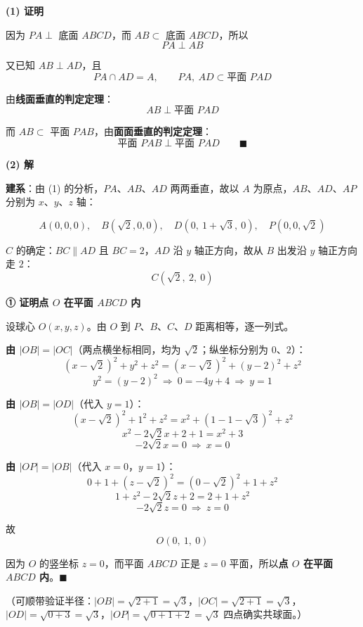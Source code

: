 \textbf{(1) 证明}

因为 $PA\perp$ 底面 $ABCD$，而 $AB\subset$ 底面 $ABCD$，所以
\[PA\perp AB\]

又已知 $AB\perp AD$，且
\[PA\cap AD=A,\qquad PA,\ AD\subset\text{平面 }PAD\]

由\textbf{线面垂直的判定定理}：
\[AB\perp\text{平面 }PAD\]

而 $AB\subset$ 平面 $PAB$，由\textbf{面面垂直的判定定理}：
\[\text{平面 }PAB\perp\text{平面 }PAD\qquad\blacksquare\]

\par\medskip

\textbf{(2) 解}

\textbf{建系}：由 (1) 的分析，$PA$、$AB$、$AD$ 两两垂直，故以 $A$ 为原点，$AB$、$AD$、$AP$ 分别为 $x$、$y$、$z$ 轴：

\[A(0,0,0),\quad B\left(\sqrt2,0,0\right),\quad D\left(0,\ 1+\sqrt3,\ 0\right),\quad P\left(0,0,\sqrt2\right)\]

$C$ 的确定：$BC\parallel AD$ 且 $BC=2$，$AD$ 沿 $y$ 轴正方向，故从 $B$ 出发沿 $y$ 轴正方向走 $2$：
\[C\left(\sqrt2,\ 2,\ 0\right)\]

\par\medskip

\textbf{① 证明点 $O$ 在平面 $ABCD$ 内}

设球心 $O(x,y,z)$。由 $O$ 到 $P$、$B$、$C$、$D$ 距离相等，逐一列式。

\textbf{由 $|OB|=|OC|$}（两点横坐标相同，均为 $\sqrt2$；纵坐标分别为 $0$、$2$）：
\[(x-\sqrt2)^2+y^2+z^2=(x-\sqrt2)^2+(y-2)^2+z^2\]
\[y^2=(y-2)^2\ \Longrightarrow\ 0=-4y+4\ \Longrightarrow\ y=1\]

\textbf{由 $|OB|=|OD|$}（代入 $y=1$）：
\[(x-\sqrt2)^2+1^2+z^2=x^2+\left(1-1-\sqrt3\right)^2+z^2\]
\[x^2-2\sqrt2x+2+1=x^2+3\]
\[-2\sqrt2x=0\ \Longrightarrow\ x=0\]

\textbf{由 $|OP|=|OB|$}（代入 $x=0$，$y=1$）：
\[0+1+\left(z-\sqrt2\right)^2=\left(0-\sqrt2\right)^2+1+z^2\]
\[1+z^2-2\sqrt2z+2=2+1+z^2\]
\[-2\sqrt2z=0\ \Longrightarrow\ z=0\]

故
\[O(0,\ 1,\ 0)\]

因为 $O$ 的竖坐标 $z=0$，而平面 $ABCD$ 正是 $z=0$ 平面，所以\textbf{点 $O$ 在平面 $ABCD$ 内}。$\blacksquare$

（可顺带验证半径：$|OB|=\sqrt{2+1}=\sqrt3$，$|OC|=\sqrt{2+1}=\sqrt3$，$|OD|=\sqrt{0+3}=\sqrt3$，$|OP|=\sqrt{0+1+2}=\sqrt3$  四点确实共球面。）

\par\medskip

